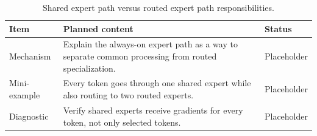 \begin{table}[H]
\centering
\caption{Shared expert path versus routed expert path responsibilities.}
\label{tab:ch08-the-role-of-shared-experts}
\begin{tabularx}{\textwidth}{p{}X p{}}
\toprule
Item & Planned content & Status \\
\midrule
Mechanism & Explain the always-on expert path as a way to separate common processing from routed specialization. & Placeholder \\
Mini-example & Every token goes through one shared expert while also routing to two routed experts. & Placeholder \\
Diagnostic & Verify shared experts receive gradients for every token, not only selected tokens. & Placeholder \\
\bottomrule
\end{tabularx}
\end{table}
